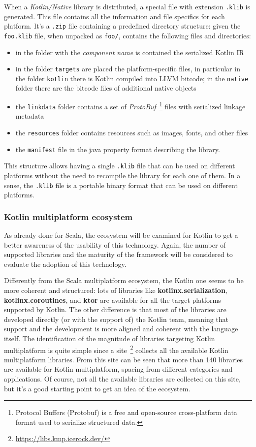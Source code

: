 When a \emph{Kotlin/Native} library is distributed, a special file with extension \texttt{.klib} is generated. This file contains all the information
and file specifics for each platform. It's a \texttt{.zip} file containing a predefined directory structure: given the \texttt{foo.klib} file, when
unpacked as \texttt{foo/}, contains the following files and directories:
\begin{itemize}
	\item in the folder with the \emph{component name} is contained the serialized Kotlin IR
	\item in the folder \texttt{targets} are placed the platform-specific files, in particular in the folder \texttt{kotlin} there is Kotlin compiled
	      into LLVM bitcode; in the \texttt{native} folder there are the bitcode files of additional native objects
	\item the \texttt{linkdata} folder contains a set of \emph{ProtoBuf}~\footnote{Protocol Buffers (Protobuf) is a free and open-source
		      cross-platform data format used to serialize structured data.} files with serialized linkage metadata
	\item the \texttt{resources} folder contains resources such as images, fonts, and other files
	\item the \texttt{manifest} file in the java property format describing the library.
\end{itemize}

This structure allows having a single \texttt{.klib} file that can be used on different platforms without the need to recompile the library for each
one of them. In a sense, the \texttt{.klib} file is a portable binary format that can be used on different platforms.

\subsubsection{Kotlin multiplatform ecosystem}

As already done for Scala, the ecosystem will be examined for Kotlin to get a better awareness of the usability of this technology.
Again, the number of supported libraries and the maturity of the framework will be considered to evaluate the adoption of this technology.

Differently from the Scala multiplatform ecosystem, the Kotlin one seems to be more coherent and structured: lots of libraries
like \textbf{kotlinx.serialization}, \textbf{kotlinx.coroutines}, and \textbf{ktor} are available for all the target platforms supported by Kotlin.
The other difference is that most of the libraries are developed directly (or with the support of) the Kotlin team, meaning that support and the
development is more aligned and coherent with the language itself.
The identification of the magnitude of libraries targeting Kotlin multiplatform is quite simple since a
site~\footnote{\url{https://libs.kmp.icerock.dev/}} collects all the available Kotlin multiplatform libraries. From this site can be seen that more
than 140 libraries are available for Kotlin multiplatform, spacing from different categories and applications. Of course, not all the available
libraries are collected on this site, but it's a good starting point to get an idea of the ecosystem.

